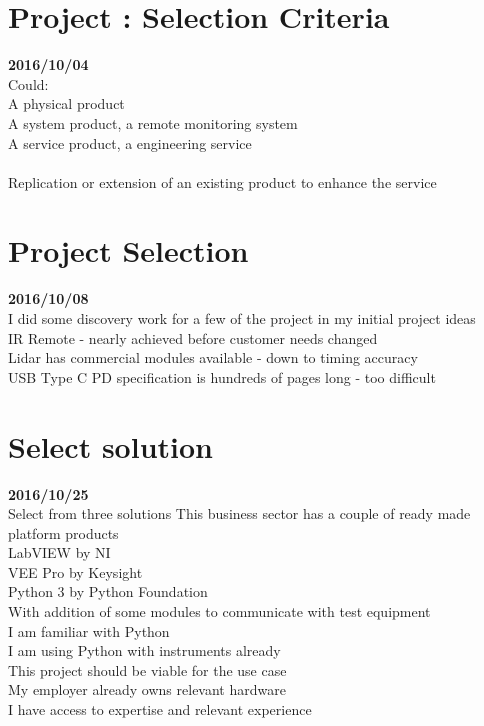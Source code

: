 \section{Project : Selection Criteria}\textbf{2016/10/04}\\
Could:\\
A physical product\\
A system product, a remote monitoring system\\
A service product, a engineering service\\
\\
Replication or extension of an existing product to enhance the service\\

\section{Project Selection}\textbf{2016/10/08}\\
I did some discovery work for a few of the project in my initial project ideas\\
IR Remote - nearly achieved before customer needs changed\\
Lidar has commercial modules available - down to timing accuracy\\
USB Type C PD specification is hundreds of pages long - too difficult\\

\section{Select solution}\textbf{2016/10/25}\\
Select from three solutions
This business sector has a couple of ready made platform products\\
LabVIEW by NI\\
VEE Pro by Keysight\\
Python 3 by Python Foundation\\
  With addition of some modules to communicate with test equipment\\

I am familiar with Python\\
I am using Python with instruments  already\\
This project should be viable for the use case\\
My employer already owns relevant hardware\\
I have access to expertise and relevant experience\\

